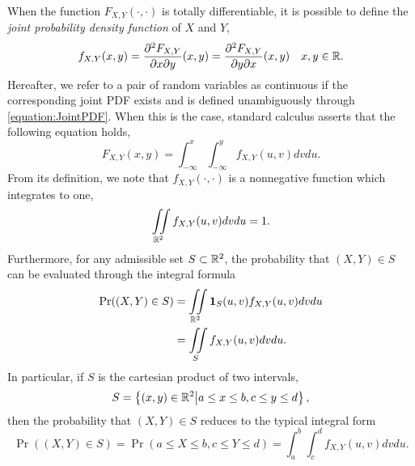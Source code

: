 When the function $F_{X,Y} (\cdot, \cdot)$ is totally differentiable, it is possible to define the \emph{joint probability density function} of $X$ and $Y$, 
\begin{equation} \label{equation:JointPDF}
f_{X,Y} (x,y) = \frac{\partial^2 F_{X,Y}}{\partial x \partial y} (x,y)
= \frac{\partial^2 F_{X,Y}}{\partial y \partial x} (x,y) \quad x,y \in  \mathbb{R} .
\end{equation}
Hereafter, we refer to a pair of random variables as continuous if the corresponding joint PDF exists and is defined unambiguously through \eqref{equation:JointPDF}.
When this is the case, standard calculus asserts that the following equation holds,
\begin{equation*}
F_{X,Y} (x,y) = \int_{-\infty}^x \int_{-\infty}^y f_{X,Y} (u,v) dv du .
\end{equation*}
From its definition, we note that $f_{X,Y} (\cdot, \cdot)$ is a nonnegative function which integrates to one,
\begin{equation*}
\iint\limits_{\mathbb{R}^2}
f_{X, Y} (u, v) dv du = 1.
\end{equation*}
Furthermore, for any admissible set $S \subset \mathbb{R}^2$, the probability that $(X,Y) \in S$ can be evaluated through the integral formula
\begin{equation} \label{equation:ProbabilityJointPDF}
\begin{split}
\Pr ((X,Y) \in S)
&= \iint\limits_{\mathbb{R}^2}
\mathbf{1}_{S} (u, v) f_{X, Y} (u, v) dv du \\
&= \iint\limits_{S}
f_{X, Y} (u, v) dv du .
\end{split}
\end{equation}
In particular, if $S$ is the cartesian product of two intervals, 
\begin{equation*}
S = \left\{ (x,y) \in \mathbb{R}^2 \big| a \leq x \leq b, c \leq y \leq d \right\} ,
\end{equation*}
then the probability that $(X,Y) \in S$ reduces to the typical integral form
\begin{equation*}
\Pr ((X,Y) \in S)
= \Pr (a \leq X \leq b, c \leq Y \leq d)
= \int_{a}^{b} \int_{c}^{d}
f_{X, Y} (u, v) dv du .
\end{equation*}


